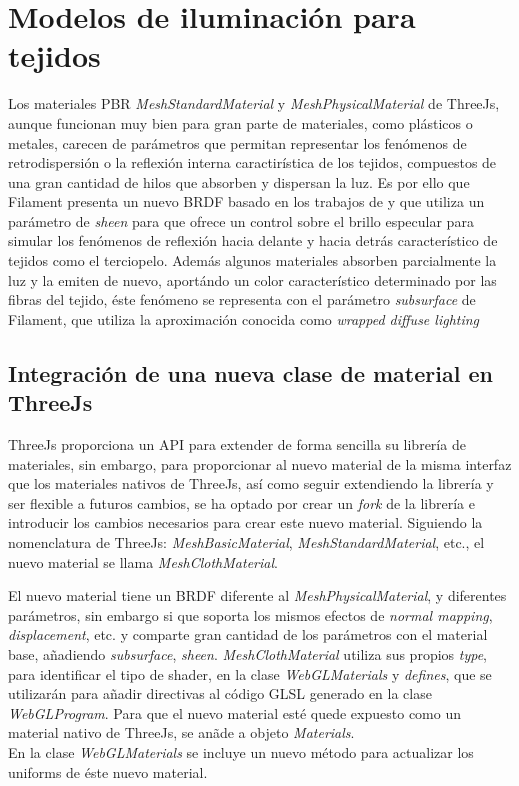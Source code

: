 \chapter{Modelos de iluminaci\'on para tejidos}

Los materiales PBR \textit{MeshStandardMaterial} y \textit{MeshPhysicalMaterial} de ThreeJs, aunque funcionan muy bien para gran parte de
materiales, como pl\'asticos o metales, carecen de par\'ametros que permitan representar los fen\'omenos de retrodispersi\'on o
la reflexi\'on interna caractir\'istica de los tejidos, compuestos de una gran cantidad de hilos que absorben y dispersan la luz.
Es por ello que Filament presenta un nuevo BRDF basado en los trabajos de y que utiliza un par\'ametro de \textit{sheen} para
que ofrece un control sobre el brillo especular para simular los fen\'omenos de reflexi\'on hacia delante y hacia detr\'as
caracter\'istico de tejidos como el terciopelo. Adem\'as algunos materiales absorben parcialmente la luz y la emiten de nuevo,
aport\'ando un color caracter\'istico determinado por las fibras del tejido, \'este fen\'omeno se representa con el par\'ametro
\textit{subsurface} de Filament, que utiliza la aproximaci\'on conocida como \textit{wrapped diffuse lighting} \autocite{orennayar}


\section{Integraci\'on de una nueva clase de material en ThreeJs}
ThreeJs proporciona un API para extender de forma sencilla su librer\'ia de materiales, sin embargo, para proporcionar al nuevo
material de la misma interfaz que los materiales nativos de ThreeJs, as\'i como seguir extendiendo la librer\'ia y ser flexible
a futuros cambios, se ha optado por crear un \textit{fork} de la librer\'ia e introducir los cambios necesarios para crear
este nuevo material. Siguiendo la nomenclatura de ThreeJs: \textit{MeshBasicMaterial}, \textit{MeshStandardMaterial}, etc., el
nuevo material se llama \textit{MeshClothMaterial}.

El nuevo material tiene un BRDF diferente al \textit{MeshPhysicalMaterial},
y diferentes par\'ametros, sin embargo si que soporta los mismos efectos de \textit{normal mapping}, \textit{displacement}, etc.
y comparte gran cantidad de los par\'ametros con el material base, a\~nadiendo \textit{subsurface}, \textit{sheen}.
\textit{MeshClothMaterial} utiliza sus propios \textit{type}, para identificar el tipo
de shader, en la clase \textit{WebGLMaterials} y \textit{defines}, que se utilizar\'an para a\~nadir directivas al c\'odigo GLSL
generado en la clase \textit{WebGLProgram}. Para que el nuevo material est\'e quede expuesto como un material nativo de ThreeJs,
se an\~ade a objeto \textit{Materials}.\\
En la clase \textit{WebGLMaterials} se incluye un nuevo m\'etodo para actualizar los uniforms de \'este nuevo material.

